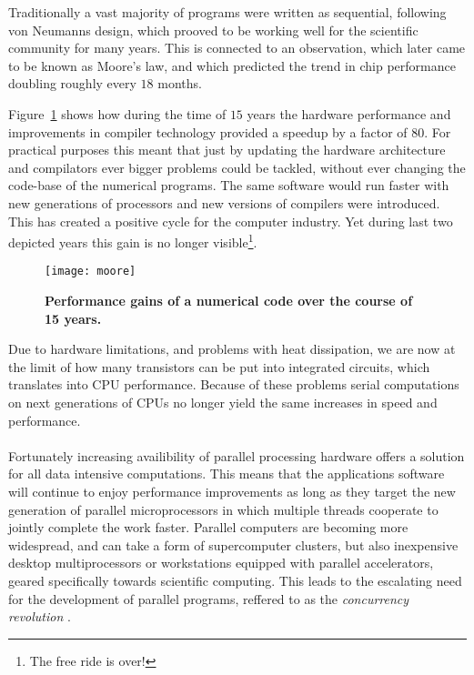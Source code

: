 Traditionally a vast majority of programs were written as sequential, following von Neumanns design, which prooved to be working well for the scientific community for many years.
This is connected to an observation, which later came to be known as Moore's law, and which predicted the trend in chip performance doubling roughly every $18$ months.

Figure~\ref{fig:moore} shows how during the time of $15$ years the hardware performance and improvements in compiler technology provided a speedup by a factor of $80$.
For practical purposes this meant that just by updating the hardware architecture and compilators ever bigger problems could be tackled, without ever changing the code-base of the numerical programs. 
The same software would run faster with new generations of processors and new versions of compilers were introduced.
This has created a positive cycle for the computer industry.
Yet during last two depicted years this gain is no longer visible\footnote{The free ride is over!}.

\begin{figure}[H]
\centering
\texttt{[image: moore]}
\caption{
{ \footnotesize 
{\bf Performance gains of a numerical code over the course of 15 years.}
} %
}
\label{fig:moore}
\end{figure}

Due to hardware limitations, and problems with heat dissipation, we are now at the limit of how many transistors can be put into integrated circuits, which translates into CPU performance.
Because of these problems serial computations on next generations of CPUs no longer yield the same increases in speed and performance.

\paragraph{}
Fortunately increasing availibility of parallel processing hardware offers a solution for all data intensive computations.
This means that the applications software will continue to enjoy performance improvements as long as they target the new generation of parallel microprocessors in which multiple threads cooperate to jointly complete the work faster.
Parallel computers are becoming more widespread, and can take a form of supercomputer clusters, but also inexpensive desktop multiprocessors or workstations equipped with parallel accelerators, geared specifically towards scientific computing.
This leads to the escalating need for the development of parallel programs, reffered to as the \textit{concurrency revolution} \citep{Sutter2005}.

